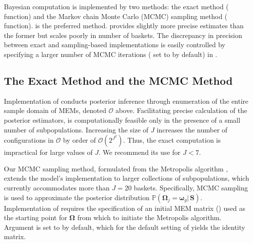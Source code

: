 Bayesian computation is implemented by two methods: the exact method ( function) and the Markov chain Monte Carlo (MCMC) sampling method ( function).  is the preferred method.  provides slightly more precise estimates than the former but scales poorly in number of baskets. The discrepancy in precision between exact and sampling-based implementations is easily controlled by specifying a larger number of MCMC iterations ( set to  by default) in .


\subsection{The Exact Method and the MCMC Method}
Implementation of  conducts posterior inference %
through enumeration of the entire sample domain of MEMs, denoted $\mathcal{O}$ above. Facilitating precise calculation of the posterior estimators,  is computationally feasible only in the presence of a small number of subpopulations. %
Increasing the size of $J$ increases the number of configurations in $\mathcal{O}$ by order of $\mathcal{O}(2^{J^2}).$ Thus, the exact computation is impractical for large values of $J$. We recommend its use for $J < 7$.

Our MCMC sampling method, formulated from the Metropolis algorithm \citep[see e.g.][]{gelman:2013}, extends the model's implementation to larger collections of subpopulations, which currently accommodates more than $J=20$ baskets. Specifically, MCMC sampling is used to approximate the posterior distribution $\mathbb{P}(\bm{\Omega}_j = \bm{\omega}_g |\, {\bm S} )$. Implementation of  requires the specification of an initial MEM matrix () used as the starting point for $\bm{\Omega}$ from which to initiate the Metropolis algorithm. Argument  is set to  by default, which for the default setting of  yields the identity matrix. 

